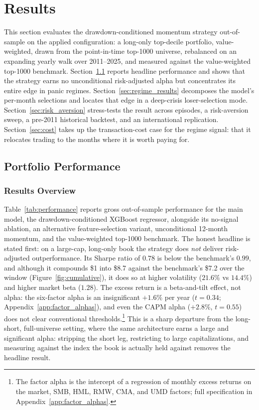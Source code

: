\clearpage
\section{Results}\label{sec:results}

This section evaluates the drawdown-conditioned momentum strategy out-of-sample on the applied configuration: a long-only top-decile portfolio, value-weighted, drawn from the point-in-time top-1000 universe, rebalanced on an expanding yearly walk over 2011--2025, and measured against the value-weighted top-1000 benchmark. Section~\ref{sec:performance_results} reports headline performance and shows that the strategy earns no unconditional risk-adjusted alpha but concentrates its entire edge in panic regimes. Section~\ref{sec:regime_results} decomposes the model's per-month selections and locates that edge in a deep-crisis loser-selection mode. Section~\ref{sec:risk_aversion} stress-tests the result across episodes, a risk-aversion sweep, a pre-2011 historical backtest, and an international replication. Section~\ref{sec:cost} takes up the transaction-cost case for the regime signal: that it relocates trading to the months where it is worth paying for.


\subsection{Portfolio Performance}\label{sec:performance_results}

\subsubsection{Results Overview}



Table~\ref{tab:performance} reports gross out-of-sample performance for the main model, the drawdown-conditioned XGBoost regressor, alongside its no-signal ablation, an alternative feature-selection variant, unconditional 12-month momentum, and the value-weighted top-1000 benchmark. The honest headline is stated first: on a large-cap, long-only book the strategy does \emph{not} deliver risk-adjusted outperformance. Its Sharpe ratio of $0.78$ is below the benchmark's $0.99$, and although it compounds \$1 into \$8.7 against the benchmark's \$7.2 over the window (Figure~\ref{fig:cumulative}), it does so at higher volatility ($21.6\%$ vs $14.4\%$) and higher market beta ($1.28$). The excess return is a beta-and-tilt effect, not alpha: the six-factor alpha is an insignificant $+1.6\%$ per year ($t = 0.34$; Appendix~\ref{app:factor_alphas}), and even the CAPM alpha ($+2.8\%$, $t = 0.55$) does not clear conventional thresholds.\footnote{The factor alpha is the intercept of a regression of monthly excess returns on the market, SMB, HML, RMW, CMA, and UMD factors; full specification in Appendix~\ref{app:factor_alphas}.} This is a sharp departure from the long-short, full-universe setting, where the same architecture earns a large and significant alpha: stripping the short leg, restricting to large capitalizations, and measuring against the index the book is actually held against removes the headline result.

